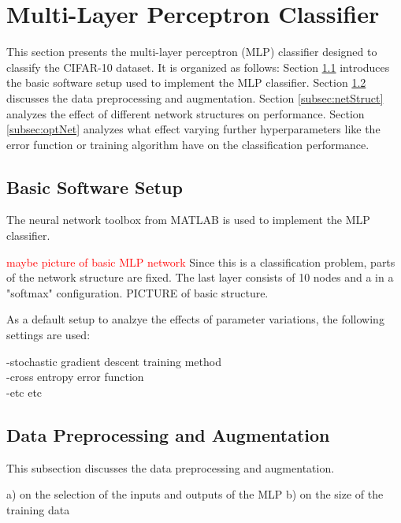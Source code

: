 \section{Multi-Layer Perceptron Classifier}
	    \pagestyle{mario}

This section presents the multi-layer perceptron (MLP) classifier designed to classify the CIFAR-10 dataset. It is organized as follows: Section \ref{subsec:setup} introduces the basic software setup used to implement the MLP classifier. Section \ref{subsec:preProp} discusses the data preprocessing and augmentation. Section \ref{subsec:netStruct} analyzes the effect of different network structures on performance. Section \ref{subsec:optNet} analyzes what effect varying further hyperparameters like the error function or training algorithm have on the classification performance.

\subsection{Basic Software Setup}\label{subsec:setup}

The neural network toolbox from MATLAB is used to implement the MLP classifier.

\textcolor{red}{maybe picture of basic MLP network}
Since this is a classification problem, parts of the network structure are fixed. The last layer consists of 10 nodes and a in a "softmax" configuration. PICTURE of basic structure.
   	
As a default setup to analzye the effects of parameter variations, the following settings are used:

-stochastic gradient descent training method\\
-cross entropy error function\\
-etc etc\\

\subsection{Data Preprocessing and Augmentation}\label{subsec:preProp}
This subsection discusses the data preprocessing and augmentation.

a) on the selection of the inputs and outputs of the MLP
b) on the size of the training data 
 
